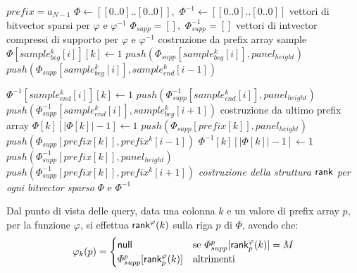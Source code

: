 \begin{algorithm}
  \footnotesize
  \begin{algorithmic}[1]
    \Comment  $prefix=a_{N-1}$ 
    \State $\varPhi\gets [[0..0]..[0..0]],\,\,\varPhi^{-1}\gets
    [[0..0]..[0..0]]$ 
    \Comment vettori di bitvector sparsi per $\varphi$ e $\varphi^{-1}$
    \State $\varPhi_{supp} = [],\,\,\varPhi_{supp}^{-1} = []$
    \Comment vettori di intvector compressi di supporto per $\varphi$ e
    $\varphi^{-1}$  
    \For {\textit{every} $k\in [0,|cols|)$}
    \Comment costruzione da prefix array sample
    \For {\textit{every} $i\in [0,|samples_{beg}|)$}
    \State $\varPhi[sample_{beg}^{k}[i]][k]\gets 1$
    \State $push(\varPhi_{supp}[sample_{beg}^{k}[i]], panel_{height})$
    \Else
    \State $push(\varPhi_{supp}[sample_{beg}^{k}[i]],sample_{end}^{k}[i-1])$
    \EndIf

    \State $\varPhi^{-1}[sample_{end}^{k}[i]][k]\gets 1$
    \State $push(\varPhi_{supp}^{-1}[sample_{end}^{k}[i]], panel_{height})$
    \Else
    \State $push(\varPhi_{supp}^{-1}[sample_{end}^{k}[i]],sample_{beg}^{k}[i+1])$
    \EndIf
    \EndFor
    \EndFor
    \For {\textit{every} $k\in [0,|prefix|)$}
    \Comment costruzione da ultimo prefix array
    \State $\varPhi[k][|\varPhi[k]|-1]\gets 1$
    \State $push(\varPhi_{supp}[prefix[k]], panel_{height})$
    \Else
    \State $push(\varPhi_{supp}[prefix[k]] ,prefix^k[i-1])$
    \EndIf
    \EndIf
    \State $\varPhi^{-1}[k][|\varPhi[k]|-1]\gets 1$
    \State $push(\varPhi^{-1}_{supp}[prefix[k]], panel_{height})$
    \Else
    \State $push(\varPhi^{-1}_{supp}[prefix[k]],prefix^k[i+1])$
    \EndIf
    \EndIf
    \EndFor
    \State \textit{costruzione della struttura $\mbox{\rm {\sf rank}}$ per ogni bitvector
    sparso} 
    $\varPhi$ e $\varPhi^{-1}$
    \EndFunction
  \end{algorithmic}
  \caption{Algoritmo per la costruzione della componente \texttt{PHI}.}
  \label{algo:phicos}
\end{algorithm}
Dal punto di vista delle query, data una colonna $k$ e un valore di
prefix array $p$, per la funzione $\varphi$, si effettua  $\mbox{\rm {\sf rank}}^\varphi(k)$
sulla riga $p$ di $\varPhi$, avendo che:
\[\varphi_k(p)=
  \begin{cases}
    \mbox{\rm {\sf null}}&\mbox{se }\varPhi_{supp}^p[\mbox{\rm {\sf rank}}^\varphi_p(k)]=M\\
    \varPhi_{supp}^p[\mbox{\rm {\sf rank}}^\varphi_p(k)]&\mbox{altrimenti }
  \end{cases}
\]
